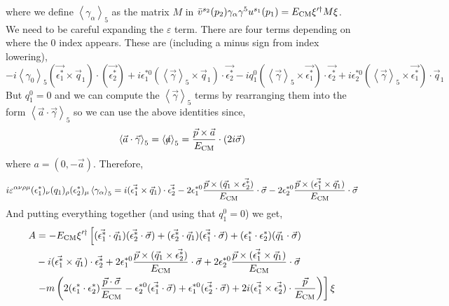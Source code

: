 \documentclass[12pt]{article}
\begin{document}
where we define $\left< \gamma_\alpha \right>_5$ as the matrix $M$ in $\bar{v}^{s_2}(p_2) \gamma_\alpha \gamma^5 u^{s_1}(p_1) = E_{\mathrm{CM}} \xi'^{\dagger} M \xi$.
We need to be careful expanding the $\varepsilon$ term. There are four terms depending on where the $0$ index appears. These are (including a minus sign from index lowering),
\[ - i \left< \gamma_0 \right>_5 (\vec{\epsilon_1^*} \times \vec{q}_1) \cdot (\vec{\epsilon^*_2}) + i \epsilon_1^{*0} (\left< \vec{\gamma} \right>_5 \times \vec{q}_1) \cdot \vec{\epsilon_2^*} - i q_1^0 (\left< \vec{\gamma} \right>_5 \times \vec{\epsilon_1^*}) \cdot \vec{\epsilon_2^*} + i \epsilon^{*0}_2 (\left< \vec{\gamma} \right>_5 \times \vec{\epsilon_1^*}) \cdot \vec{q}_1 \]
But $q_1^0 = 0$ and we can compute the $\left< \vec{\gamma} \right>_5$ terms by rearranging them into the form $\left< \vec{a} \cdot \vec{\gamma} \right>_5$ so we can use the above identities since,
\[ \left< \vec{a} \cdot \vec{\gamma} \right>_5 = \left< \slashed{a} \right>_5 = \frac{\vec{p} \times \vec{a}}{E_{\mathrm{CM}}} \cdot (2i \vec{\sigma})  \]
where $a = (0, -\vec{a})$. Therefore,
\[ i \varepsilon^{\alpha \nu \rho \mu} (\epsilon_1^*)_\nu (q_1)_\rho (\epsilon_2^*)_\mu \left< \gamma_\alpha \right>_5 = i (\vec{\epsilon^*_1} \times \vec{q}_1) \cdot \vec{\epsilon^*_2} - 2 \epsilon_1^{*0} \frac{\vec{p} \times (\vec{q}_1  \times \vec{\epsilon_2^*})}{E_{\mathrm{CM}}} \cdot \vec{\sigma} - 2 \epsilon_2^{*0} \frac{\vec{p} \times (\vec{\epsilon_1^*} \times \vec{q}_1)}{E_{\mathrm{CM}}} \cdot \vec{\sigma} \]
And putting everything together (and using that $q_1^0 = 0$) we get,
\begin{align*}
A &= -E_{\mathrm{CM}} \xi'^{\dagger} \left[ (\vec{\epsilon_1^*} \cdot \vec{q}_1) (\vec{\epsilon^*_2} \cdot \vec{\sigma}) + (\vec{\epsilon_2^*} \cdot \vec{q}_1) (\vec{\epsilon^*_1} \cdot \vec{\sigma}) + (\epsilon_1^* \cdot \epsilon_2^*) (\vec{q}_1 \cdot \vec{\sigma}) \right.
\\
& - i (\vec{\epsilon^*_1} \times \vec{q}_1) \cdot \vec{\epsilon^*_2} + 2 \epsilon_1^{*0} \frac{\vec{p} \times (\vec{q}_1  \times \vec{\epsilon_2^*})}{E_{\mathrm{CM}}} \cdot \vec{\sigma} + 2 \epsilon_2^{*0} \frac{\vec{p} \times (\vec{\epsilon_1^*} \times \vec{q}_1)}{E_{\mathrm{CM}}} \cdot \vec{\sigma}
\\
& \left. - m \left( 2(\epsilon_1^* \cdot \epsilon_2^*) \frac{\vec{p} \cdot \vec{\sigma}}{E_{\mathrm{CM}}} - \epsilon^{*0}_2 (\vec{\epsilon^*_1} \cdot \vec{\sigma}) + \epsilon^{*0}_1 (\vec{\epsilon^*_2} \cdot \vec{\sigma}) + 2i (\vec{\epsilon^*_1} \times \vec{\epsilon^*_2}) \cdot \frac{\vec{p}}{E_{\mathrm{CM}}} \right) \right] \xi
\end{align*}
\end{document}
